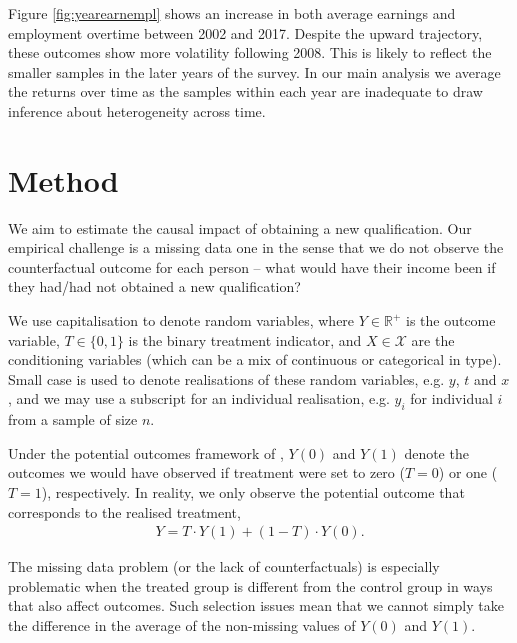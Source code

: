 \documentclass[12pt, a4paper]{article}
\begin{document}
Figure \ref{fig:yearearnempl} shows an increase in both average earnings and employment overtime between 2002 and 2017. Despite the upward trajectory, these outcomes show more volatility following 2008. This is likely to reflect the smaller samples in the later years of the survey. In our main analysis we average the returns over time as the samples within each year are inadequate to draw inference about heterogeneity across time.




\section{Method}

We aim to estimate the causal impact of obtaining a new qualification. Our empirical challenge is a missing data one in the sense that we do not observe the counterfactual outcome for each person -- what would have their income been if they had/had not obtained a new qualification?

We use capitalisation to denote random variables, where $Y \in \mathbb{R}^+$ is
the outcome variable, $T \in \{0, 1\}$ is the binary treatment indicator, and
$X \in \mathcal{X}$ are the conditioning variables (which can be a mix of
continuous or categorical in type). Small case is used to denote realisations
of these random variables, e.g. $y$, $t$ and $x$, and we may use a subscript
for an individual realisation, e.g. $y_i$ for individual $i$ from a sample of
size $n$.

Under the potential outcomes framework of \cite{imbens2015}, $Y(0)$ and $Y(1)$ denote the outcomes we would have observed if treatment were set to zero ($T=0$) or one ($T=1$), respectively. In reality, we only observe the potential outcome that corresponds to the realised treatment,
\begin{align}
Y = T \cdot Y(1) + (1-T) \cdot Y(0).
\end{align}

The missing data problem (or the lack of counterfactuals) is especially problematic when the treated group is different from the control group in ways that also affect outcomes. Such selection issues mean that we cannot simply take the difference in the average of the non-missing values of $Y(0)$ and $Y(1)$.
\end{document}
